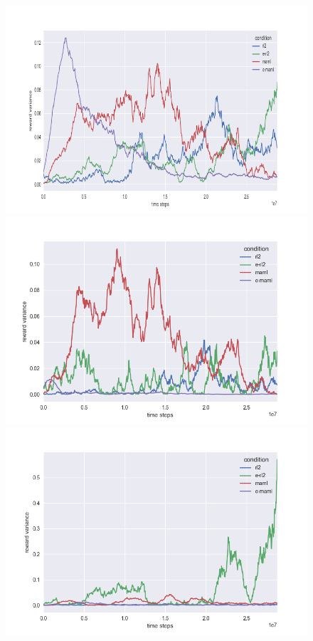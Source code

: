 \documentclass{article} %
\begin{document}
\begin{figure}[H]
\begin{center}
\includegraphics[scale=0.16]{bradly_curves/64testgridvar0_scaled.png}%
\includegraphics[scale=0.16]{bradly_curves/64testgridvar1.png}
\includegraphics[scale=0.16]{bradly_curves/64testgridvar2.png}%

\end{center}
\end{figure}
\end{document}
